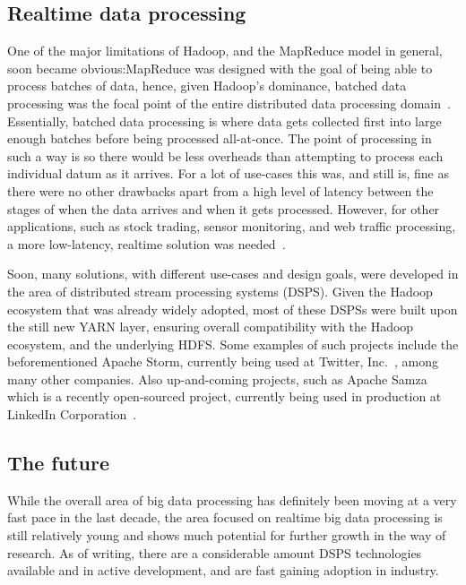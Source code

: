 \documentclass[a4paper,11pt]{article}
\begin{document}

\subsection{Realtime data processing} %
\label{sub:realtime_data_processing}

One of the major limitations of Hadoop, and the MapReduce model in general, soon became obvious:\@ MapReduce was designed
with the goal of being able to process batches of data, hence, given Hadoop's dominance, batched data processing was the
focal point of the entire distributed data processing domain~\cite{kamburugamuve_survey_2014}. Essentially, batched data
processing is where data gets collected first into large enough batches before being processed all-at-once. The point of
processing in such a way is so there would be less overheads than attempting to process each individual datum as it
arrives. For a lot of use-cases this was, and still is, fine as there were no other drawbacks apart from a high level of
latency between the stages of when the data arrives and when it gets processed. However, for other applications, such as
stock trading, sensor monitoring, and web traffic processing, a more low-latency, realtime solution was
needed~\cite{kamburugamuve_survey_2014}.

Soon, many solutions, with different use-cases and design goals, were developed in the area of distributed stream
processing systems (DSPS). Given the Hadoop ecosystem that was already widely adopted, most of these DSPSs were built
upon the still new YARN layer, ensuring overall compatibility with the Hadoop ecosystem, and the underlying HDFS. Some
examples of such projects include the beforementioned Apache Storm, currently being used at Twitter,
Inc.~\cite{toshniwal_stormtwitter_2014}, among many other companies. Also up-and-coming projects, such as Apache Samza
which is a recently open-sourced project, currently being used in production at LinkedIn Corporation~\cite{web:Samza}.


\subsection{The future} %
\label{sub:the_future}

While the overall area of big data processing has definitely been moving at a very fast pace in the last decade, the
area focused on realtime big data processing is still relatively young and shows much potential for further growth in
the way of research. As of writing, there are a considerable amount DSPS technologies available and in active
development, and are fast gaining adoption in industry.
\end{document}
